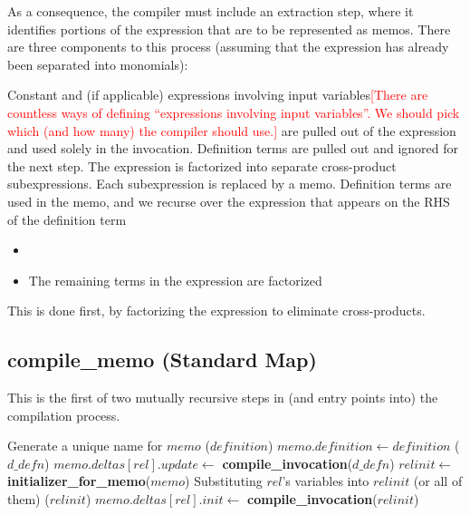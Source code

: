 \documentclass[11pt]{amsart}
\newcommand{\todo}[1]{\textcolor{red}{[#1]}}
\begin{document}
As a consequence, the compiler must include an extraction step, where it identifies portions of the expression that are to be represented as memos.  There are three components to this process (assuming that the expression has already been separated into monomials):

\begin{algorithmic}[1]
\STATE Constant and (if applicable) expressions involving input variables\todo{There are countless ways of defining ``expressions involving input variables''.  We should pick which (and how many) the compiler should use.} are pulled out of the expression and used solely in the invocation.
\STATE Definition terms are pulled out and ignored for the next step.
\STATE The expression is factorized into separate cross-product subexpressions. Each subexpression is replaced by a memo.
\STATE Definition terms are used in the memo, and we recurse over the expression that appears on the RHS of the definition term
\end{algorithmic}

\begin{itemize}
\item 
\item The remaining terms in the expression are factorized
\end{itemize}

This is done first, by factorizing the expression to eliminate cross-products.  

\subsection{compile\_memo (Standard Map)}

This is the first of two mutually recursive steps in (and entry points into) the compilation process.  

\begin{algorithmic}
\STATE Generate a unique name for $memo$
($definition$)
\STATE $memo.definition \gets definition$
  ($d\_defn$)
  \STATE $memo.deltas[rel].update \gets$ {\bf compile\_invocation}($d\_defn$)
\ENDFOR
{}
  \STATE $relinit \gets$ {\bf initializer\_for\_memo}($memo$)
  \STATE Substituting $rel$'s variables into $relinit$ (or all of them)
  ($relinit$)
  \STATE $memo.deltas[rel].init \gets$ {\bf compile\_invocation}($relinit$)
\ENDFOR
\end{algorithmic}
\end{document}
